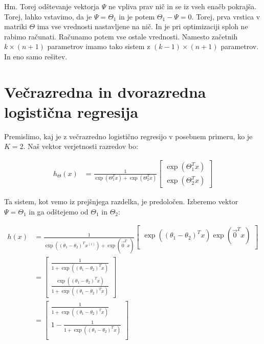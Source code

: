 Hm. Torej odštevanje vektorja $\Psi$ ne vpliva prav nič in se iz vseh enačb pokrajša. Torej, lahko vstavimo, da je $\Psi=\Theta_1$ in je potem $\Theta_1-\Psi=0$. Torej, prva vrstica v matriki $\Theta$ ima vse vrednosti nastavljene na nič. In je pri optimizaciji sploh ne rabimo računati. Računamo potem vse ostale vrednosti. Namesto začetnih $k\times(n+1)$ parametrov imamo tako sistem z $(k-1)\times(n+1)$ parametrov. In eno samo rešitev.

\section{Večrazredna in dvorazredna logistična regresija}

Premislimo, kaj je z večrazredno logistično regresijo v posebnem primeru, ko je $K=2$. Naš vektor verjetnosti razredov bo:

\begin{equation}
\begin{split}
h_\Theta(x) & =
\frac{1}{\exp(\Theta_1^T x)  + \exp(\Theta_2^T x ) }
\begin{bmatrix}
\exp( \Theta_1^T x ) \\
\exp( \Theta_2^T x )
\end{bmatrix}
\end{split}
\end{equation}

Ta sistem, kot vemo iz prejšnjega razdelka, je predoločen. Izberemo vektor $\Psi=\Theta_1$ in ga odštejemo od $\Theta_1$ in $\Theta_2$:

\begin{equation}
\begin{split}
h(x) & =
\frac{1}{ \exp( (\theta_1-\theta_2)^T x^{(i)} ) + \exp(\vec{0}^T x) }
\begin{bmatrix}
\exp( (\theta_1-\theta_2)^T x )
\exp( \vec{0}^T x ) \\
\end{bmatrix} \\
& =
\begin{bmatrix}
\frac{1}{ 1 + \exp( (\theta_1-\theta_2)^T x ) } \\
\frac{\exp( (\theta_1-\theta_2)^T x )}{ 1 + \exp( (\theta_1-\theta_2)^T x ) }
\end{bmatrix} \\
& =
\begin{bmatrix}
\frac{1}{ 1  + \exp( (\theta_1-\theta_2)^T x ) } \\
1 - \frac{1}{ 1  + \exp( (\theta_1-\theta_2)^T x ) } \\
\end{bmatrix}
\end{split}
\end{equation}

